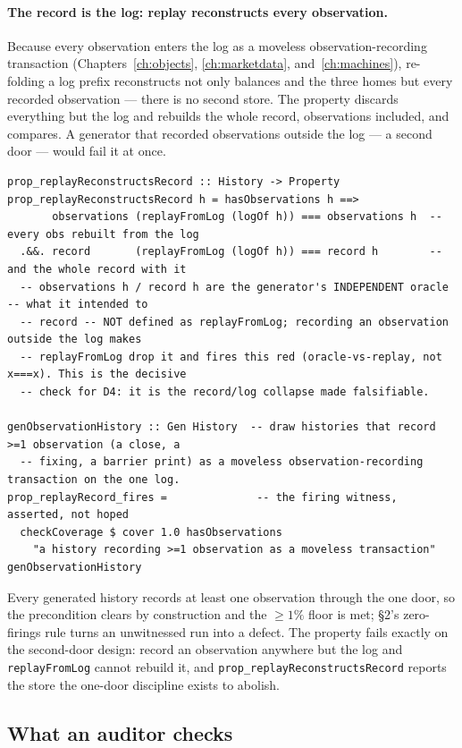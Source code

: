 \paragraph{The record is the log: replay reconstructs every observation.}
Because every observation enters the log as a moveless observation-recording transaction
(Chapters~\ref{ch:objects}, \ref{ch:marketdata}, and~\ref{ch:machines}), re-folding a log prefix
reconstructs not only balances and the three homes but every recorded observation --- there is no
second store. The property discards everything but the log and rebuilds the whole record,
observations included, and compares. A generator that recorded observations outside the log --- a
second door --- would fail it at once.

\begin{lstlisting}
prop_replayReconstructsRecord :: History -> Property
prop_replayReconstructsRecord h = hasObservations h ==>
       observations (replayFromLog (logOf h)) === observations h  -- every obs rebuilt from the log
  .&&. record       (replayFromLog (logOf h)) === record h        -- and the whole record with it
  -- observations h / record h are the generator's INDEPENDENT oracle -- what it intended to
  -- record -- NOT defined as replayFromLog; recording an observation outside the log makes
  -- replayFromLog drop it and fires this red (oracle-vs-replay, not x===x). This is the decisive
  -- check for D4: it is the record/log collapse made falsifiable.

genObservationHistory :: Gen History  -- draw histories that record >=1 observation (a close, a
  -- fixing, a barrier print) as a moveless observation-recording transaction on the one log.
prop_replayRecord_fires =              -- the firing witness, asserted, not hoped
  checkCoverage $ cover 1.0 hasObservations
    "a history recording >=1 observation as a moveless transaction" genObservationHistory
\end{lstlisting}

Every generated history records at least one observation through the one door, so the precondition
clears by construction and the $\ge 1\%$ floor is met; \S 2's zero-firings rule turns an unwitnessed
run into a defect. The property fails exactly on the second-door design: record an observation
anywhere but the log and \texttt{replayFromLog} cannot rebuild it, and
\texttt{prop\_replayReconstructsRecord} reports the store the one-door discipline exists to abolish.

\subsection{What an auditor checks}


